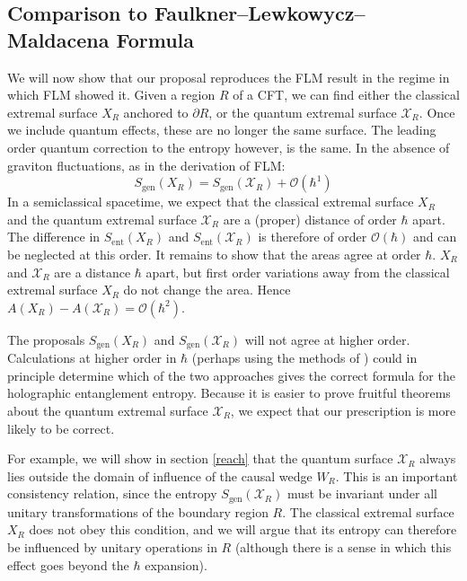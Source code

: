 \documentclass[12pt]{article}
\theoremstyle{remark}
\numberwithin{equation}{section}
\numberwithin{equation}{section}
\begin{document}
\subsection{Comparison to Faulkner--Lewkowycz--Maldacena Formula}\label{Comparison}

We will now show that our proposal reproduces the FLM result in the regime in which FLM showed it.  Given a region $R$ of a CFT, we can find either the classical extremal surface $X_R$ anchored to $\partial R$, or the quantum extremal surface $\mathcal{X}_{R}$.  Once we include quantum effects, these are no longer the same surface.  The leading order quantum correction to the entropy however, is the same.  In the absence of graviton fluctuations, as in the derivation of FLM:
\begin{equation}\label{agree}
S_\mathrm{gen}(X_{R}) = S_\mathrm{gen}(\mathcal{X}_{R}) + \mathcal{O}(\hbar^{1})
\end{equation}
In a semiclassical spacetime, we expect that the classical extremal surface $X_{R}$ and the quantum extremal surface $\mathcal{X}_{R}$ are a (proper) distance of order $\hbar$ apart.  The difference in $S_\mathrm{ent}(X_{R})$ and $S_\mathrm{ent}(\mathcal{X}_{R})$ is therefore of order $\mathcal{O}(\hbar)$ and can be neglected at this order.  It remains to show that the areas agree at order $\hbar$.  $X_{R}$ and $\mathcal{X}_{R}$ are a distance $\hbar$ apart, but first order variations away from the classical extremal surface $X_R$ do not change the area.  Hence $A(X_{R}) - A(\mathcal{X}_{R})=\mathcal{O}(\hbar^2)$.

The proposals $S_\mathrm{gen}(X_{R})$ and $S_\mathrm{gen}(\mathcal{X}_{R})$ will not agree at higher order.  Calculations at higher order in $\hbar$ (perhaps using the methods of \cite{RosenhausSmolkin14}) could in principle determine which of the two approaches gives the correct formula for the holographic entanglement entropy.   Because it is easier to prove fruitful theorems about the quantum extremal surface $\mathcal{X}_{R}$, we expect that our prescription is more likely to be correct.

For example, we will show in section \ref{reach} that the quantum surface $\mathcal{X}_{R}$ always lies outside the domain of influence of the causal wedge $W_R$.  This is an important consistency relation, since the entropy $S_\mathrm{gen}(\mathcal{X}_{R})$ must be invariant under all unitary transformations of the boundary region $R$.  The classical extremal surface $X_{R}$ does not obey this condition, and we will argue that its entropy can therefore be influenced by unitary operations in $R$ (although there is a sense in which this effect goes beyond the $\hbar$ expansion).
\end{document}
